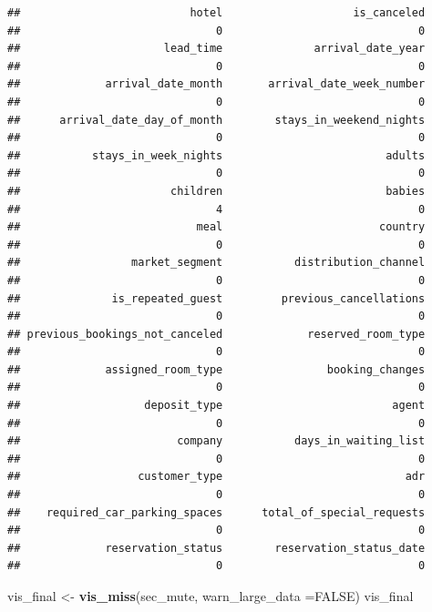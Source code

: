 \documentclass[11pt,a4paper,]{article}
\newenvironment{Shaded}{\begin{snugshade}}{\end{snugshade}}
\newcommand{\DataTypeTok}[1]{\textcolor[rgb]{0.13,0.29,0.53}{#1}}
\newcommand{\KeywordTok}[1]{\textcolor[rgb]{0.13,0.29,0.53}{\textbf{#1}}}
\newcommand{\NormalTok}[1]{#1}
\newcommand{\OtherTok}[1]{\textcolor[rgb]{0.56,0.35,0.01}{#1}}
\newcommand{\StringTok}[1]{\textcolor[rgb]{0.31,0.60,0.02}{#1}}
\begin{document}
\begin{verbatim}
##                          hotel                    is_canceled 
##                              0                              0 
##                      lead_time              arrival_date_year 
##                              0                              0 
##             arrival_date_month       arrival_date_week_number 
##                              0                              0 
##      arrival_date_day_of_month        stays_in_weekend_nights 
##                              0                              0 
##           stays_in_week_nights                         adults 
##                              0                              0 
##                       children                         babies 
##                              4                              0 
##                           meal                        country 
##                              0                              0 
##                 market_segment           distribution_channel 
##                              0                              0 
##              is_repeated_guest         previous_cancellations 
##                              0                              0 
## previous_bookings_not_canceled             reserved_room_type 
##                              0                              0 
##             assigned_room_type                booking_changes 
##                              0                              0 
##                   deposit_type                          agent 
##                              0                              0 
##                        company           days_in_waiting_list 
##                              0                              0 
##                  customer_type                            adr 
##                              0                              0 
##    required_car_parking_spaces      total_of_special_requests 
##                              0                              0 
##             reservation_status        reservation_status_date 
##                              0                              0
\end{verbatim}

\begin{Shaded}
\begin{Highlighting}[]
\NormalTok{vis_final <-}\StringTok{ }\KeywordTok{vis_miss}\NormalTok{(sec_mute, }\DataTypeTok{warn_large_data =}\OtherTok{FALSE}\NormalTok{)}
\NormalTok{vis_final}
\end{Highlighting}
\end{Shaded}
\end{document}
